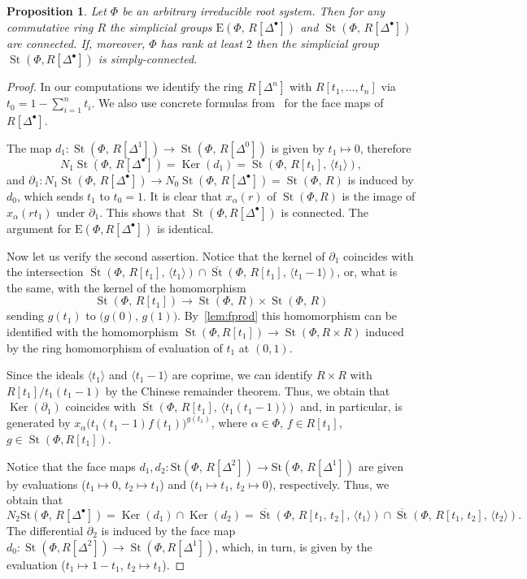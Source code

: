 \documentclass[oneside, 11pt]{amsart} \pdfoutput=1
\newcommand{\Ker}{\mathop{\mathrm{Ker}}\nolimits}
\newcommand{\St}{\mathop{\mathrm{St}}\nolimits}
\newcommand{\E}{\mathrm{E}}
\numberwithin{equation}{section}
\newtheorem{prop}[lemma]{Proposition}
\theoremstyle{definition}
\begin{document}
\begin{prop}\label{prop:pi1-StDelta} Let $\Phi$ be an arbitrary irreducible root system. Then for any commutative ring $R$ the simplicial groups $\E(\Phi,\,R[\Delta^\bullet])$ and $\St(\Phi,\,R[\Delta^\bullet])$ are connected. If, moreover, $\Phi$ has rank at least $2$ then the simplicial group $\St(\Phi, R[\Delta^\bullet])$ is simply-connected. \end{prop}
\begin{proof}
In our computations we identify the ring $R[\Delta^n]$ with $R[t_1, \ldots, t_n]$ via $t_0 = 1 - \sum_{i=1}^n t_i$. We also use concrete formulas from~\cite{Jar83} for the face maps of $R[\Delta^\bullet]$.

The map $d_1\colon\St(\Phi,\,R[\Delta^1])\rightarrow\St(\Phi,\,R[\Delta^0])$ is given by $t_1\mapsto0$, therefore \[N_1\St(\Phi,\,R[\Delta^\bullet])=\Ker(d_1)=\St(\Phi,\,R[t_1],\,\langle t_1\rangle),\]
and $\partial_1\colon N_1\St(\Phi,\,R[\Delta^\bullet])\rightarrow N_0\St(\Phi,\,R[\Delta^\bullet])=\St(\Phi,\,R)$ is induced by $d_0$, which sends $t_1$ to $t_0=1$. 
It is clear that $x_\alpha(r)$ of $\St(\Phi, R)$ is the image of $x_\alpha(rt_1)$ under $\partial_1$.
This shows that $\St(\Phi, R[\Delta^\bullet])$ is connected. The argument for $\mathrm{E}(\Phi, R[\Delta^\bullet])$ is identical.

Now let us verify the second assertion. Notice that the kernel of $\partial_1$ coincides with the intersection $\overline{\St}(\Phi,\,R[t_1],\,\langle t_1\rangle)\cap\overline{\St}(\Phi,\,R[t_1],\,\langle t_1-1 \rangle )$, or, what is the same, with the kernel of the homomorphism
\[\St(\Phi,\,R[t_1])\rightarrow\St(\Phi,\,R)\times\St(\Phi,\,R)\]
sending $g(t_1)$ to $\big(g(0),\,g(1)\big)$. By~\cref{lem:fprod} this homomorphism can be identified with the homomorphism $\St(\Phi, R[t_1]) \to \St(\Phi, R\times R)$ induced by the ring homomorphism of evaluation of $t_1$ at $(0, 1)$.

Since the ideals $\langle t_1 \rangle$ and $\langle t_1-1 \rangle$ are coprime, we can identify $R\times R$ with $R[t_1]/t_1(t_1-1)$ by the Chinese remainder theorem. Thus, we obtain that $\Ker(\partial_1)$ coincides with $\overline{\St}(\Phi,\,R[t_1],\,\langle t_1(t_1-1) \rangle)$ and, in particular, is generated by $x_\alpha\big(t_1(t_1-1)f(t_1)\big)^{g(t_1)}$, where $\alpha \in \Phi$, $f\in R[t_1]$, $g \in \St(\Phi, R[t_1])$.

Notice that the face maps $d_1, d_2\colon\mathrm{St}(\Phi,\,R[\Delta^2])\rightarrow\mathrm{St}(\Phi,\,R[\Delta^1])$ are given by evaluations ($t_1\mapsto0$, $t_2\mapsto t_1$) and ($t_1\mapsto t_1$, $t_2\mapsto0$), respectively. Thus, we obtain that \[N_2\mathrm{St}(\Phi,\,R[\Delta^\bullet])=\Ker(d_1)\cap\Ker(d_2)=\overline{\St}(\Phi,\,R[t_1,\,t_2],\,\langle t_1\rangle )\cap\overline{\St}(\Phi,\,R[t_1,\,t_2],\,\langle t_2\rangle).\]
The differential $\partial_2$ is induced by the face map $d_0 \colon \St(\Phi, R[\Delta^2]) \to \St(\Phi, R[\Delta^1])$, which, in turn, is given by the evaluation ($t_1 \mapsto 1-t_1$, $t_2 \mapsto t_1$). 


\end{proof}
\end{document}
